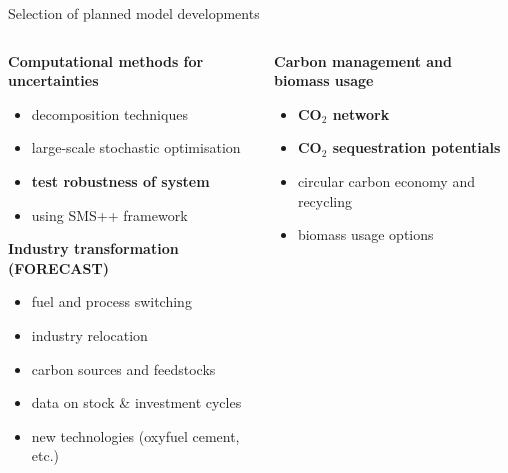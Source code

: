 \documentclass[10pt,aspectratio=169,dvipsnames]{beamer}
\begin{document}
\begin{frame}{Selection of planned model developments}
  \footnotesize
  \begin{columns}[T] %
    \begin{column}{.5\textwidth}
        \begin{minipage}[t][.45\textheight]{\linewidth}
            \begin{alertblock}{\textbf{Computational methods for uncertainties}}
                \begin{itemize}
                  \item decomposition techniques
                  \item large-scale stochastic optimisation
                  \item \textbf{test robustness of system}
                  \item using SMS++ framework
                \end{itemize}
            \end{alertblock}
        \end{minipage}
        
        \vspace{-0.03\textheight} %
        
        \begin{minipage}[t][.45\textheight]{\linewidth}
            \begin{alertblock}{\textbf{Industry transformation (FORECAST)}}
              \begin{itemize}
                \item fuel and process switching
                \item industry relocation
                \item carbon sources and feedstocks
                \item data on stock \& investment cycles
                \item new technologies (oxyfuel cement, etc.)
              \end{itemize}
            \end{alertblock}
        \end{minipage}
    \end{column}
    
    \begin{column}{.5\textwidth}
        \begin{minipage}[t][.45\textheight]{\linewidth}
            \begin{alertblock}{\textbf{Carbon management and biomass usage}}
              \begin{itemize}
                \item \textbf{CO$_2$ network}
                \item \textbf{CO$_2$ sequestration potentials}
                \item circular carbon economy and recycling
                \item biomass usage options
              \end{itemize}
            \end{alertblock}
        \end{minipage}
        

\end{column}
\end{columns}
\end{frame}
\end{document}
